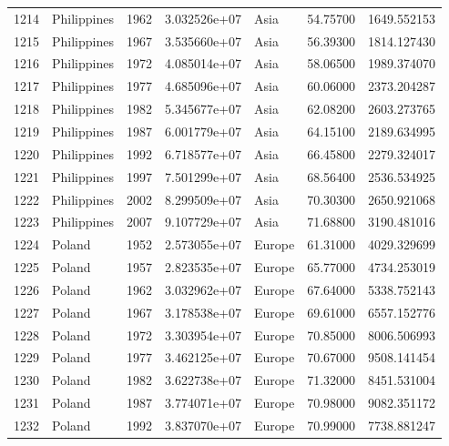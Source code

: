 \documentclass[
  letterpaper,
  DIV=11,
  numbers=noendperiod]{scrreprt}
\begin{document}
\begin{tabular}{llrrlrr}
1214 &               Philippines &  1962 &  3.032526e+07 &      Asia &  54.75700 &    1649.552153 \\
1215 &               Philippines &  1967 &  3.535660e+07 &      Asia &  56.39300 &    1814.127430 \\
1216 &               Philippines &  1972 &  4.085014e+07 &      Asia &  58.06500 &    1989.374070 \\
1217 &               Philippines &  1977 &  4.685096e+07 &      Asia &  60.06000 &    2373.204287 \\
1218 &               Philippines &  1982 &  5.345677e+07 &      Asia &  62.08200 &    2603.273765 \\
1219 &               Philippines &  1987 &  6.001779e+07 &      Asia &  64.15100 &    2189.634995 \\
1220 &               Philippines &  1992 &  6.718577e+07 &      Asia &  66.45800 &    2279.324017 \\
1221 &               Philippines &  1997 &  7.501299e+07 &      Asia &  68.56400 &    2536.534925 \\
1222 &               Philippines &  2002 &  8.299509e+07 &      Asia &  70.30300 &    2650.921068 \\
1223 &               Philippines &  2007 &  9.107729e+07 &      Asia &  71.68800 &    3190.481016 \\
1224 &                    Poland &  1952 &  2.573055e+07 &    Europe &  61.31000 &    4029.329699 \\
1225 &                    Poland &  1957 &  2.823535e+07 &    Europe &  65.77000 &    4734.253019 \\
1226 &                    Poland &  1962 &  3.032962e+07 &    Europe &  67.64000 &    5338.752143 \\
1227 &                    Poland &  1967 &  3.178538e+07 &    Europe &  69.61000 &    6557.152776 \\
1228 &                    Poland &  1972 &  3.303954e+07 &    Europe &  70.85000 &    8006.506993 \\
1229 &                    Poland &  1977 &  3.462125e+07 &    Europe &  70.67000 &    9508.141454 \\
1230 &                    Poland &  1982 &  3.622738e+07 &    Europe &  71.32000 &    8451.531004 \\
1231 &                    Poland &  1987 &  3.774071e+07 &    Europe &  70.98000 &    9082.351172 \\
1232 &                    Poland &  1992 &  3.837070e+07 &    Europe &  70.99000 &    7738.881247 \\

\end{tabular}
\end{document}
